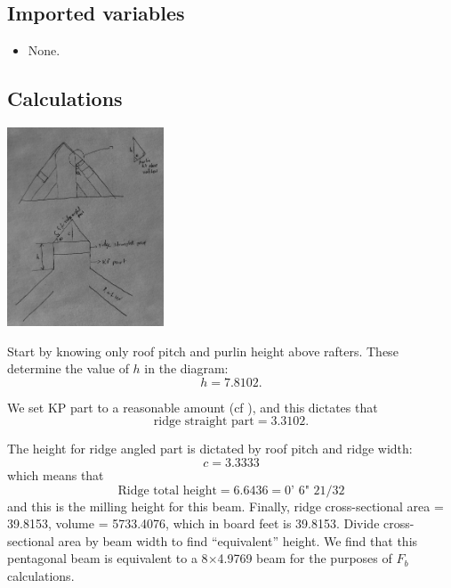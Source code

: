 \documentclass{article}\usepackage[]{graphicx}\usepackage[]{xcolor}
\begin{document}
\subsection{Imported variables} \label{ridge-shape-and-dimensions-imported-variables}

\begin{itemize}
  \item None. 
\end{itemize}

\subsection{Calculations} \label{ridge-shape-and-dimensions-calculations}
\begin{center}
	\includegraphics[width=0.35\textwidth]{images/ridge_calculations}
\end{center}


Start by knowing only roof pitch and purlin height above rafters. These determine the value of $h$ in the diagram: 
\[ h = 7.8102.\]

We set KP part to a reasonable amount (cf ), and this dictates that
\[ \text{ridge straight part} = 3.3102.\]

The height for ridge angled part is dictated by roof pitch and ridge width: 
\[c = 3.3333\]
which means that
\[  \boxed{\text{Ridge total height} = 6.6436 = \text{0' 6" 21/32}} \]
and this is the milling height for this beam. Finally, ridge cross-sectional area = 39.8153, volume = 5733.4076, which in board feet is 39.8153. Divide cross-sectional area by beam width to find ``equivalent'' height. We find that this pentagonal beam is equivalent to a 8$\times$4.9769 beam for the purposes of $F_b$ calculations.





\end{document}
